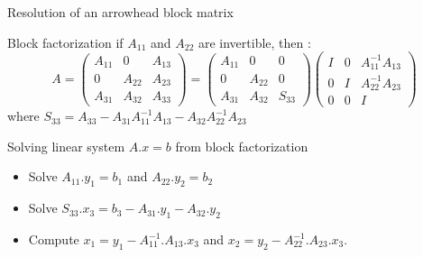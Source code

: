 \documentclass[compress,10pt,aspectratio=169]{beamer}
\begin{document}
\begin{frame}[fragile]{Resolution of an arrowhead block matrix}
  \scriptsize
  \begin{block}{\small Block factorization}
    if $A_{11}$ and $A_{22}$ are invertible, then :
    \[
      A = \left(\begin{array}{ccc}
        A_{11} & 0 & A_{13} \\
          0    & A_{22} & A_{23} \\
          A_{31} & A_{32} & A_{33}
    \end{array}\right)
    = 
    \left(\begin{array}{ccc}
      A_{11} & 0 & 0 \\
        0    & A_{22} & 0 \\
        A_{31} & A_{32} & S_{33}
  \end{array}\right)
  \left(\begin{array}{ccc}
    I & 0 & A_{11}^{-1}A_{13} \\
      0    & I & A_{22}^{-1}A_{23} \\
      0 & 0 & I
\end{array}\right)    
    \]
    where $S_{33} = A_{33} - A_{31}A_{11}^{-1}A_{13} - A_{32}A_{22}^{-1}A_{23}$
  \end{block}

  \begin{block}{\small Solving linear system $A.x=b$ from block factorization}
    \begin{itemize}
      \item Solve $A_{11}.y_{1} = b_{1}$ and $A_{22}.y_{2} = b_{2}$
      \item Solve $S_{33}.x_{3} = b_{3} - A_{31}.y_{1} -A_{32}.y_{2}$
      \item Compute $x_{1} = y_{1} - A_{11}^{-1}.A_{13}.x_{3}$ and $x_{2} = y_{2} - A_{22}^{-1}.A_{23}.x_{3}$.
    \end{itemize}
  \end{block}
\end{frame}
\end{document}
